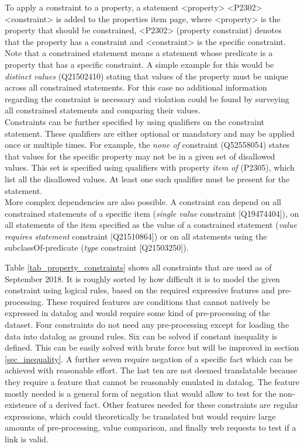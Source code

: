 \documentclass[hyperref,bachelorofscience,fleqn]{cgvpub}
\begin{document}
To apply a constraint to a property, a statement <property> <P2302> <constraint> is added to the properties item page, where <property> is the property that should be constrained, <P2302> (property constraint) denotes that the property has a constraint and <constraint> is the specific constraint. Note that a constrained statement means a statement whose predicate is a property that has a specific constraint. A simple example for this would be \emph{distinct values} (Q21502410) stating that values of the property must be unique across all constrained statements. For this case no additional information regarding the constraint is necessary and violation could be found by surveying all constrained statements and comparing their values.\\
Constraints can be further specified by using qualifiers on the constraint statement. These qualifiers are either optional or mandatory and may be applied once or multiple times. For example, the \emph{none of} constraint (Q52558054) states that values for the specific property may not be in a given set of disallowed values. This set is specified using qualifiers with property \emph{item of} (P2305), which list all the disallowed values. At least one such qualifier must be present for the statement.\\
More complex dependencies are also possible. A constraint can depend on all constrained statements of a specific item (\emph{single value} constraint [Q19474404]), on all statements of the item specified as the value of a constrained statement (\emph{value requires statement} constraint [Q21510864]) or on all statements using the subclassOf-predicate (\emph{type} constraint [Q21503250]).

Table \ref{tab_property_constraints} shows all constraints that are used as of September 2018. It is roughly sorted by how difficult it is to model the given constraint using logical rules, based on the required expressive features and pre-processing. These required features are conditions that cannot natively be expressed in datalog and would require some kind of pre-processing of the dataset. Four constraints do not need any pre-processing except for loading the data into datalog as ground rules. Six can be solved if constant inequality is defined. This can be easily solved with brute force but will be improved in section \ref{sec_inequality}. A further seven require negation of a specific fact which can be achieved with reasonable effort. The last ten  are not deemed translatable because they require a feature that cannot be reasonably emulated in datalog. The feature mostly needed is a general form of negation that would allow to test for the non-existence of a derived fact. Other features needed for these constraints are regular expressions, which could theoretically be translated but would require large amounts of pre-processing, value comparison, and finally web requests to test if a link is valid.
\end{document}
